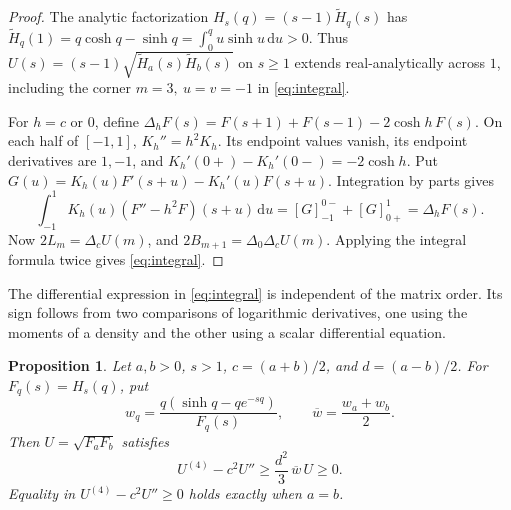 \documentclass[10pt,twoside,reqno]{amsart}
\newtheorem{proposition}{Proposition}[section]
\numberwithin{equation}{section}
\newcommand{\dd}{\,\mathrm{d}}
\begin{document}
\begin{proof}
The analytic factorization \(H_s(q)=(s-1)\widetilde H_q(s)\) has
\(\widetilde H_q(1)=q\cosh q-\sinh q=\int_0^q u\sinh u\dd u>0\).
Thus \(U(s)=(s-1)\sqrt{\widetilde H_a(s)\widetilde H_b(s)}\) on \(s\ge1\)
extends real-analytically across \(1\), including the corner
\(m=3,\ u=v=-1\) in \eqref{eq:integral}.

For \(h=c\) or \(0\), define
\(\Delta_h F(s)=F(s+1)+F(s-1)-2\cosh h\,F(s)\).
On each half of \([-1,1]\), \(K_h''=h^2K_h\). Its endpoint values vanish,
its endpoint derivatives are \(1,-1\), and
\(K_h'(0+)-K_h'(0-)=-2\cosh h\). Put
\(G(u)=K_h(u)F'(s+u)-K_h'(u)F(s+u)\). Integration by parts gives
\[
 \int_{-1}^1 K_h(u)(F''-h^2F)(s+u)\dd u
 =[G]_{-1}^{0-}+[G]_{0+}^{1}=\Delta_h F(s).
\]
Now \(2L_m=\Delta_c U(m)\), and \(2B_{m+1}=\Delta_0\Delta_c U(m)\).
Applying the integral formula twice gives \eqref{eq:integral}.
\end{proof}

The differential expression in \eqref{eq:integral} is independent of the
matrix order. Its sign follows from two comparisons of logarithmic
derivatives, one using the moments of a density and the other using a
scalar differential equation.

\begin{proposition}\label{prop:differential}
Let \(a,b>0\), \(s>1\), \(c=(a+b)/2\), and \(d=(a-b)/2\).
For \(F_q(s)=H_s(q)\), put
\[
 w_q=\frac{q(\sinh q-qe^{-sq})}{F_q(s)},\qquad
 \overline w=\frac{w_a+w_b}{2}.
\]
Then \(U=\sqrt{F_aF_b}\) satisfies
\begin{equation}\label{eq:diff-bound}
 U^{(4)}-c^2 U''\ge \frac{d^2}{3}\,\overline w\,U\ge0.
\end{equation}
Equality in \(U^{(4)}-c^2U''\ge0\) holds exactly when \(a=b\).
\end{proposition}
\end{document}
